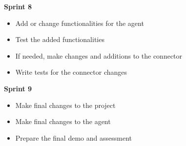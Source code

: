 \textbf{Sprint 8}

\begin{itemize}
  \item Add or change functionalities for the agent
  \item Test the added functionalities
  \item If needed, make changes and additions to the connector
  \item Write tests for the connector changes\\
\end{itemize}

\textbf{Sprint 9}

\begin{itemize}
  \item Make final changes to the project
  \item Make final changes to the agent
  \item Prepare the final demo and assessment\\
\end{itemize}
